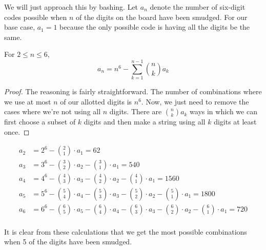 \documentclass[10pt]{../usamts}
\begin{document}

\begin{solution}
We will just approach this by bashing. Let $a_n$ denote the number of six-digit codes possible when $n$ of the digits on the board have been smudged.
For our base case, $a_1 = 1$ because the only possible code is having all the digits be the same.

\begin{claim}
    For $2 \le n \le 6$,
    $$a_n = n^6 - \sum_{k=1}^{n-1} \binom{n}{k} a_k$$
\end{claim}
\begin{proof}
    The reasoning is fairly straightforward. The number of combinations where we use at most $n$ of our allotted digits is $n^6$. Now, we just need to remove the cases where we're not using all $n$ digits. There are $\binom{n}{k} a_k$ ways in which we can first choose a subset of $k$ digits and then make a string using all $k$ digits at least once.
\end{proof}
\begin{align*}
a_2 &= 2^6 - \binom{2}{1} \cdot a_1 = 62\\
a_3 &= 3^6 - \binom{3}{2} \cdot a_2 - \binom{3}{1} \cdot a_1 = 540\\
a_4 &= 4^6 - \binom{4}{3} \cdot a_3 - \binom{4}{2} \cdot a_2 - \binom{4}{1} \cdot a_1 = 1560\\
a_5 &= 5^6 - \binom{5}{4} \cdot a_4 - \binom{5}{3} \cdot a_3 - \binom{5}{2} \cdot a_2 - \binom{5}{1} \cdot a_1 = 1800\\
a_6 &= 6^6 - \binom{6}{5} \cdot a_5 - \binom{6}{4} \cdot a_4 - \binom{6}{3} \cdot a_3 - \binom{6}{2} \cdot a_2 - \binom{6}{1} \cdot a_1 = 720\\
\end{align*}

It is clear from these calculations that we get the most possible combinations when 5 of the digits have been smudged.

\end{solution}
\end{document}
